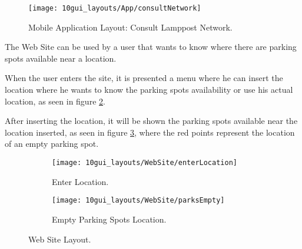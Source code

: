 \begin{figure}[H]
	\centering	
	\texttt{[image: 10gui\_layouts/App/consultNetwork]}
	\caption{Mobile Application Layout: Consult Lamppost Network.}
	\label{fig:consultNetwork}
\end{figure}

\clearpage
{}

The Web Site can be used by a user that wants to know where there are parking spots available near a location. 

When the user enters the site, it is presented a menu where he can insert the location where he wants to know the parking spots availability or use his actual location, as seen in figure \ref{fig:enterLocation}.


After inserting the location, it will be shown the parking spots available near the location inserted, as seen in figure \ref{fig:parksEmpty}, where the red points represent the location of an empty parking spot.


\begin{figure}[H]
	\centering
	\begin{subfigure}{.5\textwidth}
		\centering
		\texttt{[image: 10gui\_layouts/WebSite/enterLocation]}
		\caption{Enter Location.}
		\label{fig:enterLocation}
	\end{subfigure}%
	\begin{subfigure}{.5\textwidth}
		\centering
		\texttt{[image: 10gui\_layouts/WebSite/parksEmpty]}
		\caption{Empty Parking Spots Location.}
		\label{fig:parksEmpty}
	\end{subfigure}
	\caption{Web Site Layout.}
	\label{fig:webSite}
\end{figure}




